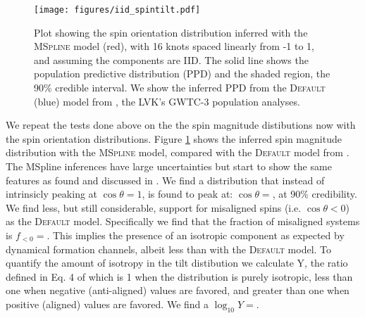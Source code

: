 \begin{figure}
    \texttt{[image: figures/iid\_spintilt.pdf]}
    \caption{Plot showing the spin orientation distribution inferred with the \textsc{MSpline} model (red), with 16 knots spaced linearly from -1 to 1, and 
    assuming the components are IID. The solid line shows the population predictive distribution (PPD) and the shaded region, the 90\% credible interval. 
    We show the inferred PPD from the \textsc{Default} (blue) model from \citet{o3b_astro_dist}, the LVK's GWTC-3 population analyses.}
    \label{fig:iid_spintilt_dist}
\end{figure}

We repeat the tests done above on the the spin magnitude distibutions now with the spin orientation distributions. Figure \ref{fig:iid_spintilt_dist} 
shows the inferred spin magnitude distribution with the \textsc{MSpline} model, compared with the \textsc{Default} model from \citet{o3b_astro_dist}. 
The MSpline inferences have large uncertainties but start to show the same features as found and discussed in \citet{spinitasyoulike}. 
We find a distribution that instead of intrinsicly peaking at $\cos{\theta}=1$, is found to peak at: $\cos{\theta}=$\result{$\CIPlusMinus{\macros[MSplineIIDCompSpins][peakCosTilt]}$}, at 
90\% credibility. We find less, but still considerable, support for misaligned spins (i.e. $\cos{\theta}<0$) as the \textsc{Default} model. Specifically we 
find that the fraction of misaligned systems is $f_{<0}=$\result{$\CIPlusMinus{\macros[MSplineIIDCompSpins][negFrac]}$}. This implies 
the presence of an isotropic component as expected by dynamical formation channels, albeit less than with the \textsc{Default} model. To quantify the 
amount of isotropy in the tilt distibution we calculate Y, the ratio defined in Eq. 4 of \citet{spinitasyoulike} which is 1 when the distribution is 
purely isotropic, less than one when negative (anti-aligned) values are favored, and greater than one when positive (aligned) values are favored.
We find a $\log_{10}Y=$. 

